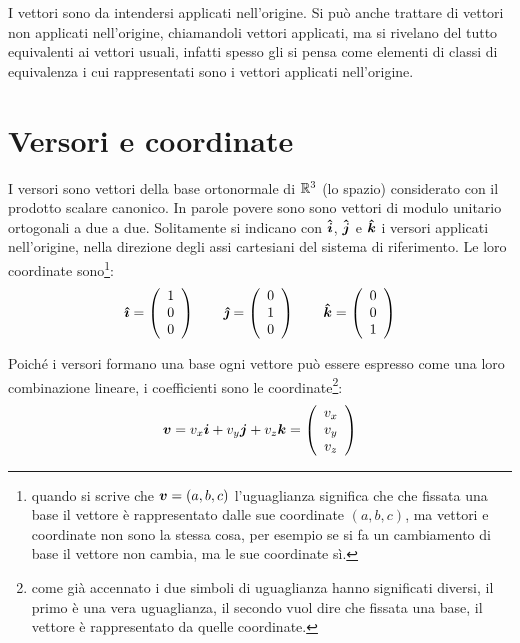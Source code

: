I vettori sono da intendersi applicati nell'origine. Si può anche trattare di vettori non applicati nell'origine, chiamandoli vettori applicati, ma si rivelano del tutto equivalenti ai vettori usuali, infatti spesso gli si pensa come elementi di classi di equivalenza i cui rappresentati sono i vettori applicati nell'origine.
\section{Versori e coordinate}
I versori sono vettori della base ortonormale di $\mathbb{R}^3$ (lo spazio) considerato con il prodotto scalare canonico. In parole povere sono sono vettori di modulo unitario ortogonali a due a due. Solitamente si indicano con $\boldsymbol{\hat {i}}$, $\boldsymbol{\hat {j}}$ e $\boldsymbol{\hat {k}}$ i versori applicati nell'origine, nella direzione degli assi cartesiani del sistema di riferimento. Le loro coordinate sono\footnote{quando si scrive che $\boldsymbol{v}=(a,b,c)$ l'uguaglianza significa che che fissata una base il vettore è rappresentato dalle sue coordinate $(a,b,c)$, ma vettori e coordinate non sono la stessa cosa, per esempio se si fa un cambiamento di base il vettore non cambia, ma le sue coordinate sì.}:
\begin{equation*}
\boldsymbol{\hat {\imath}}=\left(\begin{array}{c} 1\\0\\0\\ \end{array}\right)\qquad
\boldsymbol{\hat {\jmath}}=\left(\begin{array}{c} 0\\1\\0\\ \end{array}\right)\qquad
\boldsymbol{\hat {k}}=\left(\begin{array}{c} 0\\0\\1\\ \end{array}\right)
\end{equation*}

Poiché i versori formano una base ogni vettore può essere espresso come una loro combinazione lineare, i coefficienti sono le coordinate\footnote{come già accennato i due simboli di uguaglianza hanno significati diversi, il primo è una vera uguaglianza, il secondo vuol dire che fissata una base, il vettore è rappresentato da quelle coordinate.}:
\begin{equation*}
\boldsymbol{v}=v_x\boldsymbol{i}+v_y\boldsymbol{j}+v_z\boldsymbol{k}=\left(
\begin{array}{c}
v_x\\v_y\\v_z\\
\end{array}\right)
\end{equation*}
